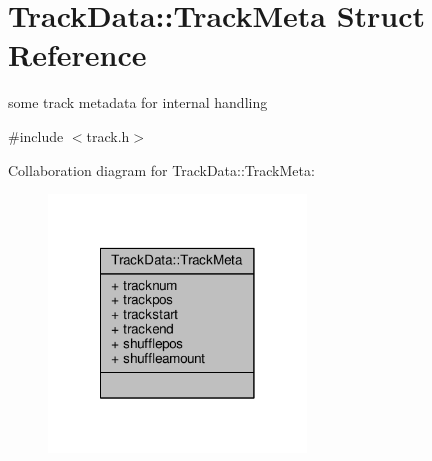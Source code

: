 \hypertarget{structTrackData_1_1TrackMeta}{\section{Track\-Data\-:\-:Track\-Meta Struct Reference}
\label{structTrackData_1_1TrackMeta}
}


some track metadata for internal handling  




{\ttfamily \#include $<$track.\-h$>$}



Collaboration diagram for Track\-Data\-:\-:Track\-Meta\-:\nopagebreak
\begin{figure}[H]
\begin{center}
\leavevmode
\includegraphics[width=194pt]{structTrackData_1_1TrackMeta__coll__graph}
\end{center}
\end{figure}
